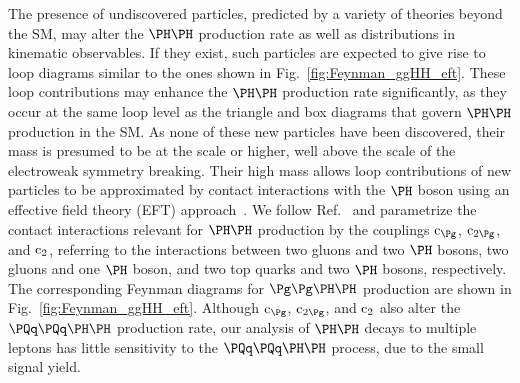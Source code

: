 The presence of undiscovered particles, predicted by a variety of theories beyond the SM, may alter the $\HH$ production rate
as well as distributions in kinematic observables.
If they exist, such particles are expected to give rise to loop diagrams similar to the ones shown in Fig.~\ref{fig:Feynman_ggHH_eft}.
These loop contributions may enhance the $\HH$ production rate significantly,
as they occur at the same loop level as the triangle and box diagrams that govern $\HH$ production in the SM.
As none of these new particles have been discovered, their mass is presumed to be at the \TeV scale or higher,
well above the scale of the electroweak symmetry breaking.
Their high mass allows loop contributions of new particles to be approximated by contact interactions with the $\PHiggs$ boson
using an effective field theory (EFT) approach~\cite{Buchmuller:1985jz,Grzadkowski:2010es}.
We follow Ref.~\cite{Carvalho:2015ttv} and parametrize the contact interactions relevant for $\HH$ production by the couplings $\cg$, $\cgg$, and $\text{c}_{2}$,
referring to the interactions between two gluons and two $\PHiggs$ bosons, two gluons and one $\PHiggs$ boson, 
and two top quarks and two $\PHiggs$ bosons, respectively.
The corresponding Feynman diagrams for $\ggHH$ production are shown in Fig.~\ref{fig:Feynman_ggHH_eft}.
Although $\cg$, $\cgg$, and $\text{c}_{2}$ also alter the $\qqHH$ production rate,
our analysis of $\HH$ decays to multiple leptons
has little sensitivity to the $\qqHH$ process, due to the small signal yield.

